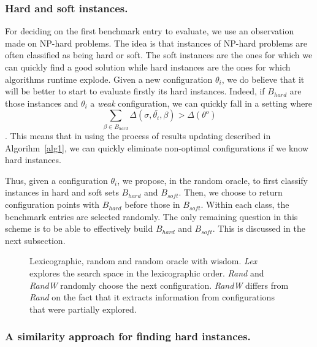 \documentclass[10pt, conference, compsocconf]{IEEEtran}
\begin{document}
\subsubsection{Hard and soft instances.}

For deciding on the first benchmark entry to evaluate, we use an
observation made on NP-hard problems.  The idea is that instances of
NP-hard problems are often classified as being hard or soft. The soft
instances are the ones for which we can quickly find a good solution
while hard instances are the ones for which algorithms runtime
explode.  Given a new configuration $\theta_i$, we do believe that it
will be better to start to evaluate firstly its hard
instances. Indeed, if $B_{hard}$ are those instances and $\theta_i$ a
{\it weak} configuration, we can quickly fall in a setting where
\[ \sum_{\beta \in B_{hard}} \Delta(\sigma, \bar{\theta_i}, \beta) >
\Delta(\theta^o)\].
This means that in using the process of results updating described in
Algorihm~\ref{alg1}, we can quickly eliminate non-optimal
configurations if we know hard instances.

Thus, given a configuration $\theta_i$, we propose, in the random
oracle, to first classify instances in hard and soft sets $B_{hard}$
and $B_{soft}$. Then, we choose to return configuration points with
$B_{hard}$ before those in $B_{soft}$. Within each class, the
benchmark entries are selected randomly.  The only remaining question
in this scheme is to be able to effectively build $B_{hard}$ and
$B_{soft}$.  This is discussed in the next subsection.


	\begin{figure}[hbtp]
	\begin{center}
	
	\caption{Lexicographic, random and random oracle with wisdom.
        {\it Lex} explores the search space in the lexicographic order. {\it Rand}  and {\it RandW}
        randomly choose the next configuration. {\it RandW} differs from {\it Rand} on the fact that
        it extracts information from configurations that were partially explored.}
	\label{fig:Search}
	\end{center}
	\end{figure}


\subsubsection{A similarity approach for finding hard instances.}
\end{document}
